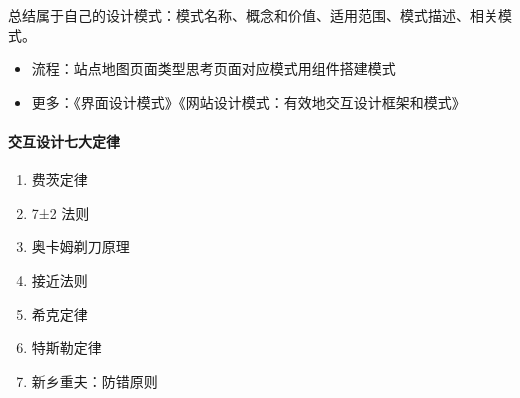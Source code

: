 \documentclass[letterpaper,10pt,english]{sphinxmanual}
\begin{document}
总结属于自己的设计模式：模式名称、概念和价值、适用范围、模式描述、相关模式。
\begin{itemize}
\item {} 
流程：站点地图\sphinxhyphen{}页面类型\sphinxhyphen{}思考页面对应模式\sphinxhyphen{}用组件搭建模式

\item {} 
更多：《界面设计模式》《网站设计模式：有效地交互设计框架和模式》

\end{itemize}


\paragraph{交互设计七大定律}
\label{\detokenize{chapter_idea/design:id4}}\begin{enumerate}
%
\item {} 
费茨定律

\item {} 
7±2 法则

\item {} 
奥卡姆剃刀原理

\item {} 
接近法则

\item {} 
希克定律

\item {} 
特斯勒定律

\item {} 
新乡重夫：防错原则

\end{enumerate}
\end{document}
